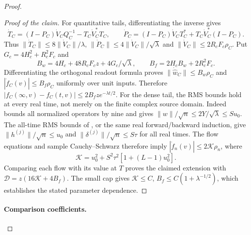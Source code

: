 \begin{proof}
\begin{proof}[Proof of the claim]
For quantitative tails, differentiating the inverse gives
\[
 \dot T_C=(I-P_C)\dot V_CQ_C^{-1}-T_C\dot V_C^*T_C,\qquad
 \dot P_C=(I-P_C)\dot V_CT_C^*+T_C\dot V_C^*(I-P_C).
\]
Thus $\|\dot T_C\|\le8\|\dot V_C\|/\lambda$,
$\|\dot P_C\|\le4\|\dot V_C\|/\sqrt\lambda$ and
$\|\dot V_C\|\le2R_cF_c\rho_C$.
Put $G_c=4H_c^2+R_c^2F_c$ and
\[
 B_w=4H_c+48R_cF_cz+4G_c/\sqrt\lambda,
 \qquad B_f=2H_cB_w+2R_c^2F_c.
\]
Differentiating the orthogonal readout formula proves
$\|\dot{\widehat w}_C\|\le B_w\rho_C$ and
$|\dot f_C(v)|\le B_f\rho_C$ uniformly over unit inputs.
Therefore $|f_C(\infty,v)-f_C(t,v)|\le2B_fz e^{-\lambda t/2}$.
For the dense tail, the RMS bounds hold at every real time, not merely
on the finite complex source domain. Indeed  bounds all
normalized operators by nine and gives
$\|w\|/\sqrt n\le2Y/\sqrt\lambda\le Su_0$.
The all-time RMS bounds of , or the same real
forward/backward induction, give
$\|h^{(j)}\|/\sqrt n\le u_0$ and
$\|\delta^{(j)}\|/\sqrt n\le S\tau$ for all real times.
The flow equations and sample Cauchy--Schwarz therefore imply
$|\dot f_n(v)|\le2\mathcal K\rho_n$, where
\[
 \mathcal K=u_0^2+S^2\tau^2[1+(L-1)u_0^2].
\]
Comparing each flow with its value at $T$ proves the claimed extension with
$\mathcal D=z(16\mathcal K+4B_f)$.
The small cap gives $\mathcal K\le C$, $B_f\le C(1+\lambda^{-1/2})$,
which establishes the stated parameter dependence.
\end{proof}

\paragraph{Comparison coefficients.}


\end{proof}
